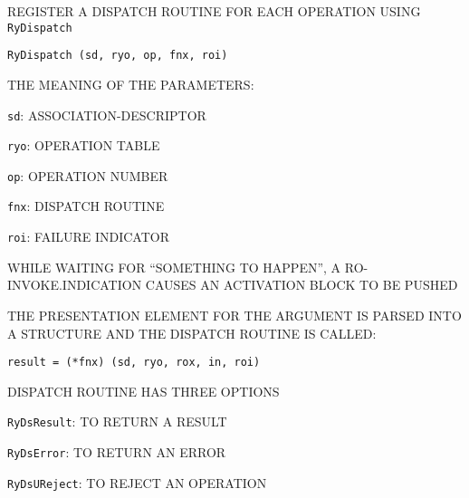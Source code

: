 \begin{bwslide}

\begin{nrtc}
\item	REGISTER A DISPATCH ROUTINE FOR EACH OPERATION USING \verb"RyDispatch"
\begin{verbatim}
RyDispatch (sd, ryo, op, fnx, roi)
\end{verbatim}

\item	THE MEANING OF THE PARAMETERS:
    \begin{nrtc}
    \item	\verb"sd": ASSOCIATION-DESCRIPTOR

    \item	\verb"ryo": OPERATION TABLE

    \item	\verb"op": OPERATION NUMBER

    \item	\verb"fnx": DISPATCH ROUTINE

    \item	\verb"roi": FAILURE INDICATOR
    \end{nrtc}
\end{nrtc}
\end{bwslide}


\begin{bwslide}

\begin{nrtc}
\item	WHILE WAITING FOR ``SOMETHING TO HAPPEN'', A RO-INVOKE.INDICATION
	CAUSES AN ACTIVATION BLOCK TO BE PUSHED

\item	THE PRESENTATION ELEMENT FOR THE ARGUMENT IS PARSED INTO A STRUCTURE
	AND THE DISPATCH ROUTINE IS CALLED:
\begin{verbatim}
result = (*fnx) (sd, ryo, rox, in, roi)    
\end{verbatim}

\item	DISPATCH ROUTINE HAS THREE OPTIONS
    \begin{nrtc}
    \item	\verb"RyDsResult": TO RETURN A RESULT

    \item	\verb"RyDsError": TO RETURN AN ERROR

    \item	\verb"RyDsUReject": TO REJECT AN OPERATION
    \end{nrtc}
\end{nrtc}
\end{bwslide}


